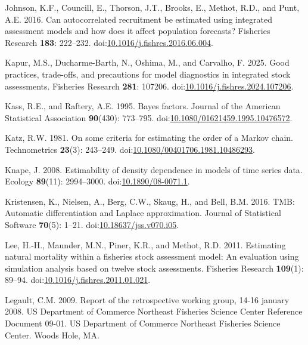 \documentclass[
  12pt,
]{article}
\newlength{\cslhangindent}
\newenvironment{CSLReferences}[2] %
 {\begin{list}{}{%
  \setlength{\itemindent}{0pt}
  \setlength{\leftmargin}{0pt}
  \setlength{\parsep}{0pt}
  \ifodd #1
   \setlength{\leftmargin}{\cslhangindent}
   \setlength{\itemindent}{-1\cslhangindent}
  \fi
  \setlength{\itemsep}{#2\baselineskip}}}
 {\end{list}}
\begin{document}
\begin{CSLReferences}{1}{0}
Johnson, K.F., Councill, E., Thorson, J.T., Brooks, E., Methot, R.D.,
and Punt, A.E. 2016. Can autocorrelated recruitment be estimated using
integrated assessment models and how does it affect population
forecasts? Fisheries Research \textbf{183}: 222--232.
doi:\href{https://doi.org/10.1016/j.fishres.2016.06.004}{10.1016/j.fishres.2016.06.004}.

Kapur, M.S., Ducharme-Barth, N., Oshima, M., and Carvalho, F. 2025. Good
practices, trade-offs, and precautions for model diagnostics in
integrated stock assessments. Fisheries Research \textbf{281}: 107206.
doi:\href{https://doi.org/10.1016/j.fishres.2024.107206}{10.1016/j.fishres.2024.107206}.

Kass, R.E., and Raftery, A.E. 1995. Bayes factors. Journal of the
American Statistical Association \textbf{90}(430): 773--795.
doi:\href{https://doi.org/10.1080/01621459.1995.10476572}{10.1080/01621459.1995.10476572}.

Katz, R.W. 1981. On some criteria for estimating the order of a {M}arkov
chain. Technometrics \textbf{23}(3): 243--249.
doi:\href{https://doi.org/10.1080/00401706.1981.10486293}{10.1080/00401706.1981.10486293}.

Knape, J. 2008. Estimability of density dependence in models of time
series data. Ecology \textbf{89}(11): 2994--3000.
doi:\href{https://doi.org/10.1890/08-0071.1}{10.1890/08-0071.1}.

Kristensen, K., Nielsen, A., Berg, C.W., Skaug, H., and Bell, B.M. 2016.
{TMB}: Automatic differentiation and {L}aplace approximation. Journal of
Statistical Software \textbf{70}(5): 1--21.
doi:\href{https://doi.org/10.18637/jss.v070.i05}{10.18637/jss.v070.i05}.

Lee, H.-H., Maunder, M.N., Piner, K.R., and Methot, R.D. 2011.
Estimating natural mortality within a fisheries stock assessment model:
An evaluation using simulation analysis based on twelve stock
assessments. Fisheries Research \textbf{109}(1): 89--94.
doi:\href{https://doi.org/10.1016/j.fishres.2011.01.021}{10.1016/j.fishres.2011.01.021}.

Legault, C.M. 2009. Report of the retrospective working group, 14-16
january 2008. US Department of Commerce Northeast Fisheries Science
Center Reference Document 09-01. US Department of Commerce Northeast
Fisheries Science Center. Woods Hole, MA.


\end{CSLReferences}
\end{document}
